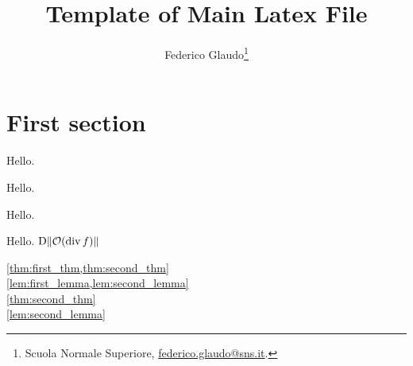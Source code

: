 \documentclass[a4paper,12pt]{article}
\title{Template of Main Latex File}
\author{Federico Glaudo\thanks{Scuola Normale Superiore, \url{federico.glaudo@sns.it}.}}
\begin{document}
 
\maketitle
\tableofcontents

\section{First section}
\begin{theorem}\label{thm:first_thm}
    Hello.
\end{theorem}
\begin{theorem}\label{thm:second_thm}
    Hello.
\end{theorem}
\begin{lemma}\label{lem:first_lemma}
    Hello.
\end{lemma}
\begin{lemma}\label{lem:second_lemma}
    Hello. $\mathrm D\lVert\mathcal{O}(\operatorname{div} f)\rVert$
\end{lemma}
\cref{thm:first_thm,thm:second_thm}\\
\cref{lem:first_lemma,lem:second_lemma}\\
\cref{thm:second_thm}\\
\cref{lem:second_lemma}

\end{document}
